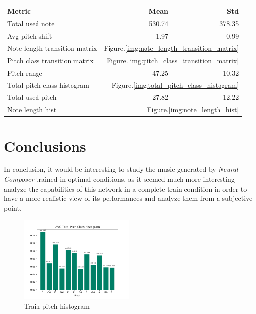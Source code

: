 \documentclass[10pt,twocolumn,letterpaper]{article}
\begin{document}
\begin{center}
    \begin{tabular}{l r r} 
        \hline
        \textbf{Metric} & \textbf{Mean} & \textbf{Std}   \\ [0.5ex] 
        \hline\hline
        Total used note & 530.74 & 378.35 \\
        \hline
        Avg pitch shift & 1.97 & 0.99 \\
        \hline
        Note length transition matrix & \multicolumn{2}{r}{Figure.\ref{img:note_length_transition_matrix}} \\
        \hline
        Pitch class transition matrix & \multicolumn{2}{r}{Figure.\ref{img:pitch_class_transition_matrix}} \\
        \hline
        Pitch range & 47.25 & 10.32 \\
        \hline
        Total pitch class histogram & \multicolumn{2}{r}{Figure.\ref{img:total_pitch_class_histogram}} \\
        \hline
        Total used pitch & 27.82 & 12.22 \\
        \hline
        Note length hist & \multicolumn{2}{r}{Figure.\ref{img:note_length_hist}} \\
        \hline
    \end{tabular}
\end{center}


\section{Conclusions}
In conclusion, it would be interesting to study the music generated by \textit{Neural Composer} trained in optimal conditions, as it seemed much more interesting analyze the capabilities of this network in a complete train condition in order to have a more realistic view of its performances and analyze them from a subjective point.





{\small


}



% 
% 

\begin{figure}[!h]
  \centering
  \includegraphics[width = 160pt]{./images/01-abs-train/8.png}
  \caption{Train pitch histogram}
  \label{img:train_totalpitchclasshistogram}
\end{figure}
\end{document}
